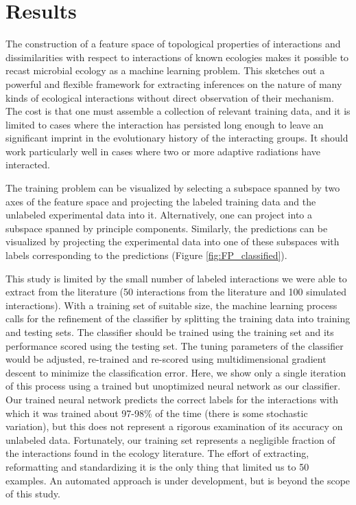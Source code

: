 \section{Results}

The construction of a feature space of topological properties of interactions and dissimilarities with respect to interactions of known ecologies makes it possible to recast microbial ecology as a machine learning problem. This sketches out a powerful and flexible framework for extracting inferences on the nature of many kinds of ecological interactions without direct observation of their mechanism. The cost is that one must assemble a collection of relevant training data, and it is limited to cases where the interaction has persisted long enough to leave an significant imprint in the evolutionary history of the interacting groups. It should work particularly well in cases where two or more adaptive radiations have interacted.

The training problem can be visualized by selecting a subspace spanned by two axes of the feature space and projecting the labeled training data and the unlabeled experimental data into it. Alternatively, one can project into a subspace spanned by principle components. Similarly, the predictions can be visualized by projecting the experimental data into one of these subspaces with labels corresponding to the predictions (Figure \ref{fig:FP_classified}).



This study is limited by the small number of labeled interactions we were able to extract from the literature (50 interactions from the literature and 100 simulated interactions). With a training set of suitable size, the machine learning process calls for the refinement of the classifier by splitting the training data into training and testing sets. The classifier should be trained using the training set and its performance scored using the testing set. The tuning parameters of the classifier would be adjusted, re-trained and re-scored using multidimensional gradient descent to minimize the classification error. Here, we show only a single iteration of this process using a trained but unoptimized neural network as our classifier. Our trained neural network predicts the correct labels for the interactions with which it was trained about 97-98\% of the time (there is some stochastic variation), but this does not represent a rigorous examination of its accuracy on unlabeled data. Fortunately, our training set represents a negligible fraction of the interactions found in the ecology literature. The effort of extracting, reformatting and standardizing it is the only thing that limited us to 50 examples. An automated approach is under development, but is beyond the scope of this study.